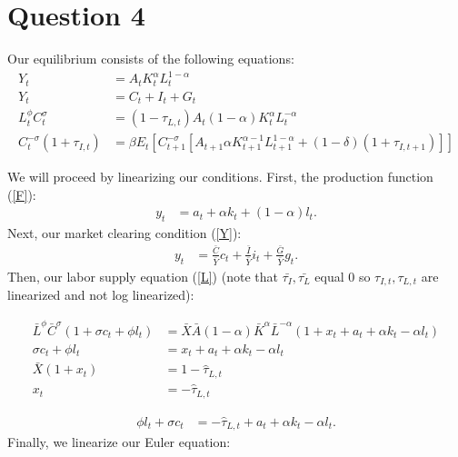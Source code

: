 \documentclass[11pt]{article} %
\begin{document}
\section{Question 4}
Our equilibrium consists of the following equations:
\begin{align}
Y_{t} &= A_tK_t^{\alpha}L_t^{1-\alpha} \label{F}\\
Y_{t} &= C_{t} + I_{t} + G_{t} \label{Y}\\
L_{t}^{\phi}C_t^{\sigma} &= (1-\tau_{L,t})A_t(1-\alpha) K_t^{\alpha}L_t^{-\alpha} \label{L}\\
C_t^{-\sigma}(1+\tau_{I,t}) &= \beta E_t[C_{t+1}^{-\sigma}[A_{t+1}\alpha K_{t+1}^{\alpha-1}L_{t+1}^{1-\alpha} + (1-\delta)(1+\tau_{I,t+1})]] \label{EE}
\end{align}

We will proceed by linearizing our conditions. First, the production function (\ref{F}):
\begin{align}
y_t &= a_t + \alpha k_t + (1-\alpha) l_t. \label{f}
\end{align}
Next, our market clearing condition (\ref{Y}):
\begin{align}
y_t &= \frac{\bar{C}}{\bar{Y}}c_t + \frac{\bar{I}}{\bar{Y}} i_t + \frac{\bar{G}}{\bar{Y}} g_t. \label{y}
\end{align}
Then, our labor supply equation (\ref{L}) (note that $\bar{\tau_{I}},\bar{\tau_{L}}$ equal 0 so $\tau_{I,t},\tau_{L,t}$ are linearized and not log linearized):

\begin{align*}
\bar{L}^{\phi}\bar{C}^{\sigma}(1+\sigma c_t + \phi l_t) &= \bar{X} \bar{A}(1-\alpha) \bar{K}^{\alpha}\bar{L}^{-\alpha}(1+x_t + a_t + \alpha k_t - \alpha l_t) \\
\sigma c_t + \phi l_t &= x_t + a_t + \alpha k_t - \alpha l_t\\
\bar{X}(1+x_t) &= 1-\hat{\tau}_{L,t}\\
x_t &=-\hat{\tau}_{L,t}
\end{align*}

\begin{align}
\phi l_t + \sigma c_t &= -\hat{\tau}_{L,t} + a_t +\alpha k_t -\alpha l_t. \label{l}
\end{align}
Finally, we linearize our Euler equation:
\end{document}
